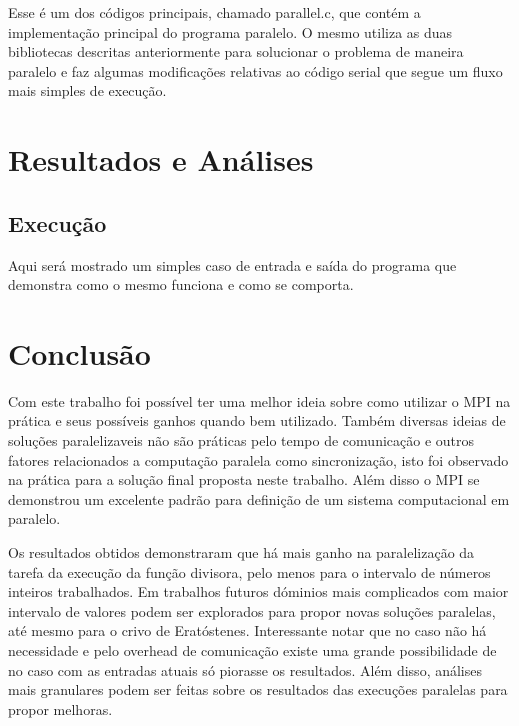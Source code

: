 \documentclass{article}
\begin{document}
Esse é um dos códigos principais, chamado parallel.c, que contém a implementação principal do programa paralelo. O mesmo utiliza as duas bibliotecas descritas anteriormente para solucionar o problema de maneira paralelo e faz algumas modificações relativas ao código serial que segue um fluxo mais simples de execução.

\section{Resultados e Análises}
\subsection{Execução}

Aqui será mostrado um simples caso de entrada e saída do programa que demonstra como o mesmo funciona e como se comporta.


\section{Conclusão}

Com este trabalho foi possível ter uma melhor ideia sobre como utilizar o MPI na prática e seus possíveis ganhos quando bem utilizado. Também diversas ideias de soluções paralelizaveis não são práticas pelo tempo de comunicação e outros fatores relacionados a computação paralela como sincronização, isto foi observado na prática para a solução final proposta neste trabalho. Além disso o MPI se demonstrou um excelente padrão para definição de um sistema computacional em paralelo.

Os resultados obtidos demonstraram que há mais ganho na paralelização da tarefa da execução da função divisora, pelo menos para o intervalo de números inteiros trabalhados. Em trabalhos futuros dóminios mais complicados com maior intervalo de valores podem ser explorados para propor novas soluções paralelas, até mesmo para o crivo de Eratóstenes. Interessante notar que no caso não há necessidade e pelo overhead de comunicação existe uma grande possibilidade de no caso com as entradas atuais só piorasse os resultados. Além disso, análises mais granulares podem ser feitas sobre os  resultados das execuções paralelas para propor melhoras.



\end{document}
